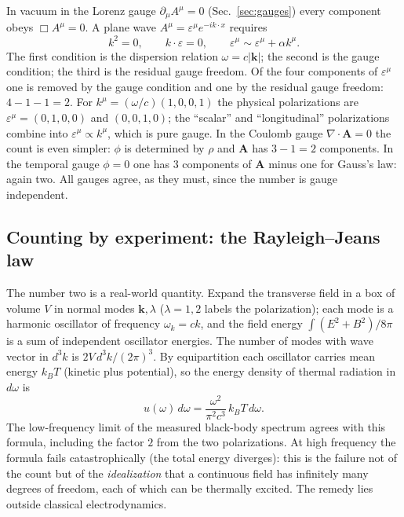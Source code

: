 \documentclass[11pt,a4paper]{book}
\begin{document}
In vacuum in the Lorenz gauge $\partial_\mu A^\mu=0$ (Sec.~\ref{sec:gauges}) every component
obeys $\Box A^\mu=0$. A plane wave $A^\mu=\varepsilon^\mu e^{-ik\cdot x}$ requires
\begin{equation}
k^2=0,\qquad k\cdot\varepsilon=0,\qquad\varepsilon^\mu\sim\varepsilon^\mu+\alpha k^\mu .
\end{equation}
The first condition is the dispersion relation $\omega=c|\mathbf k|$; the second is the gauge
condition; the third is the residual gauge freedom. Of the four components of
$\varepsilon^\mu$ one is removed by the gauge condition and one by the residual gauge
freedom: $4-1-1=2$. For $k^\mu=(\omega/c)(1,0,0,1)$ the physical polarizations are
$\varepsilon^\mu=(0,1,0,0)$ and $(0,0,1,0)$; the ``scalar'' and ``longitudinal''
polarizations combine into $\varepsilon^\mu\propto k^\mu$, which is pure gauge.
In the Coulomb gauge $\nabla\cdot\mathbf A=0$ the count is even simpler: $\phi$ is determined
by $\rho$ and $\mathbf A$ has $3-1=2$ components. In the temporal gauge $\phi=0$
one has $3$ components of $\mathbf A$ minus one for Gauss's law: again two.
All gauges agree, as they must, since the number is gauge independent.

\subsection{Counting by experiment: the Rayleigh--Jeans law}

The number two is a real-world quantity. Expand the transverse field in a box of volume $V$ in
normal modes $\mathbf k,\lambda$ ($\lambda=1,2$ labels the polarization); each mode is a harmonic
oscillator of frequency $\omega_k=ck$, and the field energy $\int(E^2+B^2)/8\pi$ is a sum of
independent oscillator energies. The number of modes with wave vector in $d^3k$ is
$2V\,d^3k/(2\pi)^3$. By equipartition each oscillator carries mean energy $k_BT$ (kinetic plus
potential), so the energy density of thermal radiation in $d\omega$ is
\begin{equation}
u(\omega)\,d\omega=\frac{\omega^2}{\pi^2c^3}\,k_BT\,d\omega .
\end{equation}
The low-frequency limit of the measured black-body spectrum agrees with this
formula, including the factor $2$ from the two polarizations. At high frequency the formula
fails catastrophically (the total energy diverges): this is the failure not of the count
but of the \emph{idealization} that a continuous field has infinitely many degrees of freedom,
each of which can be thermally excited. The remedy lies outside classical electrodynamics.
\end{document}
